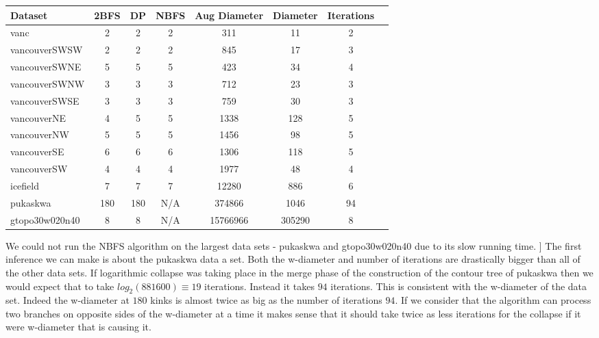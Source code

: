 \begin{center}
\begin{tabular}{l*{6}{c}r}
Dataset             & 2BFS  & DP    & NBFS    & Aug Diameter  & Diameter  & Iterations\\
\hline
vanc                & 2     & 2     & 2       & 311           & 11        & 2  \\
vancouverSWSW       & 2     & 2     & 2       & 845           & 17        & 3  \\
vancouverSWNE       & 5     & 5     & 5       & 423           & 34        & 4  \\
vancouverSWNW       & 3     & 3     & 3       & 712           & 23        & 3  \\
vancouverSWSE       & 3     & 3     & 3       & 759           & 30        & 3  \\
vancouverNE         & 4     & 5     & 5       & 1338          & 128       & 5  \\
vancouverNW         & 5     & 5     & 5       & 1456          & 98        & 5  \\
vancouverSE         & 6     & 6     & 6       & 1306          & 118       & 5  \\
vancouverSW         & 4     & 4     & 4       & 1977          & 48        & 4  \\
icefield            & 7     & 7     & 7       & 12280         & 886       & 6  \\
pukaskwa            & 180   & 180   & N/A     & 374866        & 1046      & 94 \\
gtopo30w020n40      & 8     & 8     & N/A     & 15766966      & 305290    & 8  \\

\end{tabular}
\end{center}

We could not run the NBFS algorithm on the largest data sets - pukaskwa and gtopo30w020n40 due to its slow running time.
]
The first inference we can make is about the pukaskwa data a set. Both the w-diameter and number of iterations are drastically bigger than all of the other data sets. If logarithmic collapse was taking place in the merge phase of the construction of the contour tree of pukaskwa then we would expect that to take $log_2(881600) \equiv 19$ iterations. Instead it takes $94$ iterations. This is consistent with the w-diameter of the data set. Indeed the w-diameter at $180$ kinks is almost twice as big as the number of iterations $94$. If we consider that the algorithm can process two branches on opposite sides of the w-diameter at a time it makes sense that it should take twice as less iterations for the collapse if it were w-diameter that is causing it.

